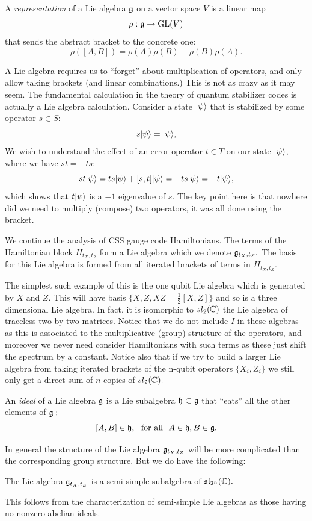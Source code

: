 A \emph{representation} of a Lie algebra $\mathfrak{g}$
on a vector space $V$ 
is a linear map
$$
    \rho : \mathfrak{g} \to \mathrm{GL}(V)
$$
that sends the abstract bracket to the concrete one:
$$
    \rho([A, B]) = \rho(A)\rho(B) - \rho(B)\rho(A).
$$

A Lie algebra requires us to ``forget'' about
multiplication of operators, and only allow taking brackets (and linear
combinations.)
This is not as crazy as it may seem.
The fundamental calculation in the theory of
quantum stabilizer codes is actually a Lie
algebra calculation. Consider a state $|{\psi}\rangle$
that is stabilized by some operator $s\in S:$
$$
    s|{\psi}\rangle = |{\psi}\rangle,
$$
We wish to understand the effect of an error operator $t\in T$
on our state $|{\psi}\rangle$, where we have $st = -ts:$
$$
    st|{\psi}\rangle = ts|{\psi}\rangle + [s, t]|{\psi}\rangle = -ts|{\psi}\rangle = -t|{\psi}\rangle,
$$
which shows that $t|{\psi}\rangle$ is a $-1$ eigenvalue of $s.$
The key point here is that nowhere did we need to multiply (compose) two operators,
it was all done using the bracket.

We continue the analysis of CSS gauge code Hamiltonians.
The terms of the Hamiltonian block $H_{t_X,t_Z}$
form a Lie algebra which we denote $\mathfrak{g}_{t_X,t_Z}.$
The basis for this Lie algebra is formed from all iterated 
brackets of terms in $H_{t_X,t_Z}.$

The simplest such example of this is the one qubit Lie algebra
which is generated by $X$ and $Z.$
This will have basis $\{X, Z, XZ = \frac{1}{2}[X, Z]\}$
and so is a three dimensional Lie algebra. In fact, it is isomorphic
to $sl_2(\mathbb{C})$ the Lie algebra of traceless two by two
matrices.
Notice that we do not include $I$ in these algebras as
this is associated to the multiplicative (group) structure
of the operators, and moreover we never need consider Hamiltonians
with such terms as these just shift the spectrum by a constant.
Notice also that if we try to build a larger Lie algebra
from taking iterated brackets of
the n-qubit operators $\{X_i, Z_i\}$ we still only get
a direct sum of $n$ copies of $sl_2(\mathbb{C}).$

An \emph{ideal} of a Lie algebra $\mathfrak{g}$
is a Lie subalgebra $\mathfrak{h}\subset\mathfrak{g}$ that ``eats''
all the other elements of $\mathfrak{g}:$
$$
    [A, B] \in \mathfrak{h}, \ \ \mbox{for all}\ \  A\in\mathfrak{h}, B\in\mathfrak{g}.
$$

In general the structure of the Lie algebra $\mathfrak{g}_{t_X,t_Z}$ 
will be more complicated than the corresponding group structure.
But we do have the following:
\begin{framed}
The Lie algebra $\mathfrak{g}_{t_X,t_Z}$ is a semi-simple
subalgebra of $\mathfrak{sl}_{2^n}(\mathbb{C}).$
\end{framed}
This follows from the characterization of
semi-simple Lie algebras as those having no
nonzero abelian ideals.

